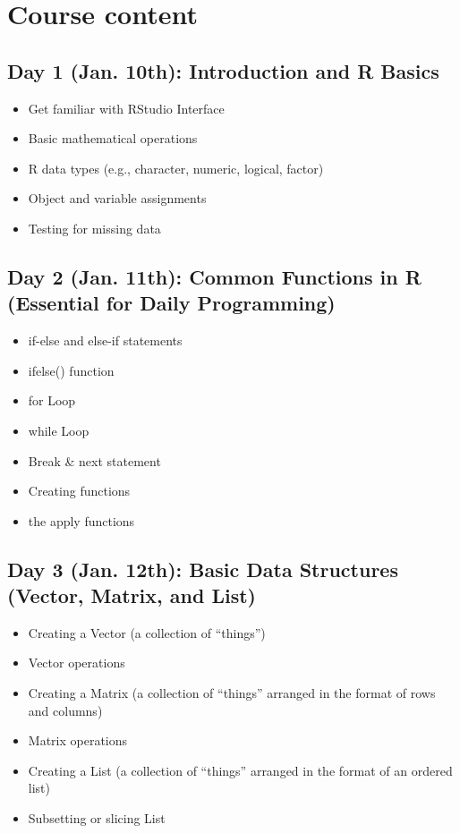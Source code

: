\documentclass[11pt, a4paper]{article}
\begin{document}

\newpage
\section*{Course content}
\subsection*{Day 1 (Jan. 10th): Introduction and R Basics}

\begin{itemize}
   \item Get familiar with RStudio Interface
   \item Basic mathematical operations
   \item R data types (e.g., character, numeric, logical, factor)
   \item Object and variable assignments
   \item Testing for missing data
\end{itemize}

\subsection*{Day 2 (Jan. 11th): Common Functions in R (Essential for Daily Programming)}
\begin{itemize}
   \item if-else and else-if statements
   \item ifelse() function
   \item for Loop 
   \item while Loop
   \item Break \& next statement 
   \item Creating functions
   \item the apply functions
\end{itemize}


\subsection*{Day 3 (Jan. 12th): Basic Data Structures (Vector, Matrix, and List)}

\begin{itemize}
   \item Creating a Vector (a collection of ``things'')
   \item Vector operations
   \item Creating a Matrix (a collection of ``things'' arranged in the format of rows and columns)
   \item Matrix operations
   \item Creating a List (a collection of ``things'' arranged in the format of an ordered list)
   \item Subsetting or slicing List
\end{itemize}
\end{document}

